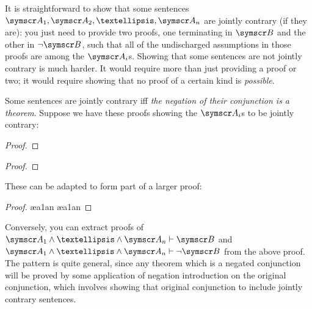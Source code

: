 It is straightforward to show that some sentences $\meta{A}_{1},\meta{A}_{2},…, \meta{A}_{n}$ are jointly contrary (if they are): you just need to provide two proofs, one terminating in $\meta{B}$ and the other in $\enot\meta{B}$, such that all of the undischarged assumptions in those proofs are among the $\meta{A}_{i}$s. Showing that some sentences are not jointly contrary is much harder. It would require more than just providing a proof or two; it would require showing that no proof of a certain kind is \emph{possible}.


Some sentences are jointly contrary iff \emph{the negation of their conjunction is a theorem}. Suppose we have these proofs showing the $\meta{A}_{i}$s to be jointly contrary: 

\begin{multicols}{2}\noindent
	\begin{proof}
		\hypo[\ ]{}{\vdots}
		\have[\ ]{}{\vdots}
	\end{proof}

	\begin{proof}
		\hypo[\ ]{}{\vdots}
		\have[\ ]{}{\vdots}
	\end{proof}
\end{multicols}

These can be adapted to form part of a larger proof:
\begin{proof}
	\open
		\ae{a1an}
		\have[\ ]{}{\vdots}
		\ae{a1an}
		\have[\ ]{}{\vdots}
		\have[\ ]{}{\vdots}
		\close
	\end{proof}
Conversely, you can extract proofs of $\meta{A}_{1}\wedge … \wedge \meta{A}_{n}\proves \meta{B}$ and $\meta{A}_{1}\wedge … \wedge \meta{A}_{n}\proves \enot\meta{B}$ from the above proof. The pattern is quite general, since any theorem which is a negated conjunction will be proved by some application of negation introduction on the original conjunction, which involves showing that original conjunction to include jointly contrary sentences.

